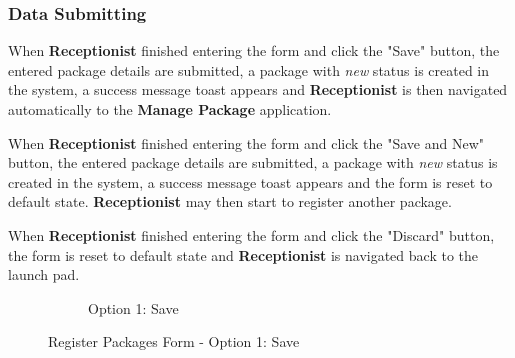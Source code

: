 \subsubsection{Data Submitting}

When \textbf{Receptionist} finished entering the form and click the "Save" button, the entered package details are submitted, a package with \textit{new} status is created in the system, a success message toast appears and \textbf{Receptionist} is then navigated automatically to the \textbf{Manage Package} application. 

When \textbf{Receptionist} finished entering the form and click the "Save and New" button, the entered package details are submitted, a package with \textit{new} status is created in the system, a success message toast appears and the form is reset to default state. \textbf{Receptionist} may then start to register another package.

When \textbf{Receptionist} finished entering the form and click the "Discard" button, the form is reset to default state and \textbf{Receptionist} is navigated back to the launch pad.

\begin{figure}[H]
	\centering
    \begin{subfigure}{1\linewidth}
        \centering
        \vspace{5pt}
        \caption{Option 1: Save}
        \label{fig:RPsaveOp}
    \end{subfigure}%
    \caption{Register Packages Form - Option 1: Save}
    \label{fig:RPsaveOp}
\end{figure}


